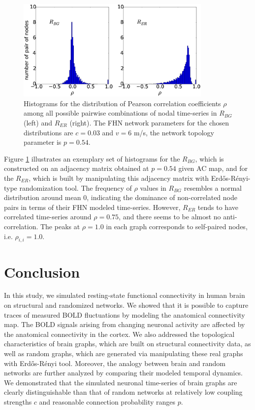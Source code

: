 \documentclass[fleqn,10pt]{wlpeerj}
\begin{document}
\begin{figure}[htp] \centering
	 \includegraphics[width=0.85\textwidth]{Figures/Random_ACM_histo_taks.eps} 
   	 \caption{Histograms for the distribution of Pearson correlation coefficients $\rho$ among all possible pairwise combinations of nodal time-series in $R_{BG}$ (left) and $R_{ER}$ (right). The FHN network parameters for the chosen distributions are $c=0.03$ and $v=6$ m/s, the network topology parameter is $p=0.54$. } 
    \label{fig:histo_ex}
\end{figure} 

Figure \ref{fig:histo_ex} illustrates an exemplary set of histograms for the $R_{BG}$, which is constructed on an adjacency matrix obtained at $p=0.54$ given AC map, and for the $R_{ER}$, which is built by manipulating this adjacency matrix with Erd\H{o}s-R\'{e}nyi-type randomization tool. The frequency of $\rho$ values in $R_{BG}$ resembles a normal distribution around mean 0, indicating the dominance of non-correlated node pairs in terms of their FHN modeled time-series. However, $R_{ER}$ tends to have correlated time-series around $\rho=0.75$, and there seems to be almost no anti-correlation. The peaks at $\rho=1.0$ in each graph corresponds to self-paired nodes, i.e. $\rho_{i,i}=1.0$.  




\section*{Conclusion}

In this study, we simulated resting-state functional connectivity in human brain on structural and randomized networks. We showed that it is possible to capture traces of measured BOLD fluctuations by modeling the anatomical connectivity map. The BOLD signals arising from changing neuronal activity are affected by the anatomical connectivity in the cortex. We also addressed the topological characteristics of brain graphs, which are built on structural connectivity data, as well as random graphs, which are generated via manipulating these real graphs with Erd\H{o}s-R\'{e}nyi tool. Moreover, the analogy between brain and random networks are further analyzed by comparing their modeled temporal dynamics.  We demonstrated that the simulated neuronal time-series of brain graphs are clearly distinguishable than that of random networks at relatively low coupling strengths $c$ and reasonable connection probability ranges $p$.   
\end{document}
